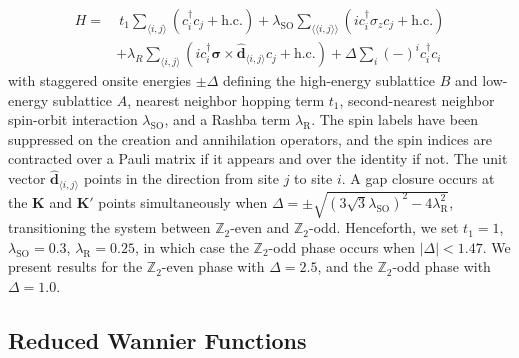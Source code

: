 \documentclass[galley,aps,pra,10pt,amsmath,amssymb,
    superscriptaddress,nofootinbib,longbibliography]{revtex4-2}
\begin{document}
\begin{equation}
\begin{split}
   H = &\  t_1 \sum_{\langle i, j \rangle} (c_i^{\dagger}c_j + \textrm{h.c.}) +   \lambda_{\textrm{SO}} \sum_{\langle\langle i,j \rangle\rangle} (ic_i^{\dagger} \sigma_z c_j + \textrm{h.c.})
    \\ & + \lambda_{R} \sum_{\langle i,j\rangle} (i c_i^{\dagger} \boldsymbol{\sigma} \times \hat{\mathbf{d}}_{\langle i, j \rangle} c_j + \textrm{h.c.}) + \Delta\sum_i (-)^i  c_i^{\dagger}c_i
\end{split}   
\end{equation}
with staggered onsite energies $\pm \Delta$ defining the high-energy sublattice $B$ and low-energy sublattice $A$, nearest neighbor hopping term $t_1$, second-nearest neighbor spin-orbit interaction $\lambda_{\textrm{SO}}$, and a Rashba term $\lambda_{\textrm{R}}$. The spin labels have been suppressed on the creation and annihilation operators, and the spin indices are contracted over a Pauli matrix if it appears and over the identity if not. The unit vector $\hat{\mathbf{d}}_{\langle i, j \rangle}$ points in the direction from site $j$ to site $i$. A gap closure occurs at the $\mathbf{K}$ and $\mathbf{K'}$ points simultaneously when $\Delta =\pm \sqrt{(3\sqrt{3}\lambda_{\textrm{SO}})^2-4\lambda_{\textrm{R}}^2}$, transitioning the system between $\mathbb{Z}_2$-even and $\mathbb{Z}_2$-odd. Henceforth, we set $t_1=1$, $\lambda_{\textrm{SO}}=0.3$, $\lambda_{\textrm{R}}=0.25$, in which case the $\mathbb{Z}_2$-odd phase occurs when $|\Delta| < 1.47$. We present results for the $\mathbb{Z}_2$-even phase with $\Delta = 2.5$, and the $\mathbb{Z}_2$-odd phase with $\Delta = 1.0$.


\subsection{Reduced Wannier Functions}
\end{document}
